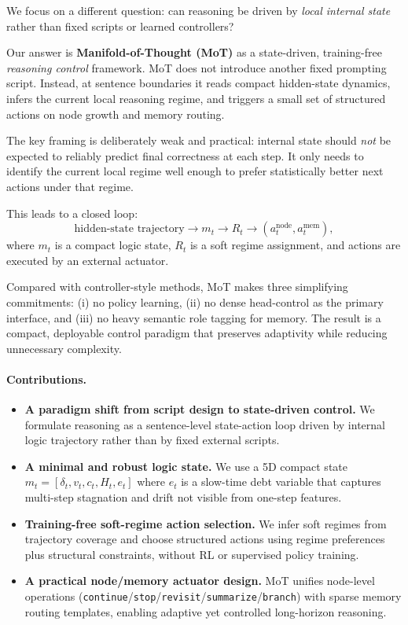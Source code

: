 \documentclass{article}
\begin{document}
We focus on a different question: can reasoning be driven by \emph{local internal state} rather than fixed scripts or learned controllers?

Our answer is \textbf{Manifold-of-Thought (MoT)} as a state-driven, training-free \emph{reasoning control} framework. MoT does not introduce another fixed prompting script. Instead, at sentence boundaries it reads compact hidden-state dynamics, infers the current local reasoning regime, and triggers a small set of structured actions on node growth and memory routing.

The key framing is deliberately weak and practical: internal state should \emph{not} be expected to reliably predict final correctness at each step. It only needs to identify the current local regime well enough to prefer statistically better next actions under that regime.

This leads to a closed loop:
\[
\text{hidden-state trajectory}
\rightarrow
m_t
\rightarrow
R_t
\rightarrow
(a_t^{\text{node}}, a_t^{\text{mem}}),
\]
where $m_t$ is a compact logic state, $R_t$ is a soft regime assignment, and actions are executed by an external actuator.

Compared with controller-style methods, MoT makes three simplifying commitments: (i) no policy learning, (ii) no dense head-control as the primary interface, and (iii) no heavy semantic role tagging for memory. The result is a compact, deployable control paradigm that preserves adaptivity while reducing unnecessary complexity.

\paragraph{Contributions.}
\begin{itemize}[leftmargin=1.3em, itemsep=0.2em]
    \item \textbf{A paradigm shift from script design to state-driven control.} We formulate reasoning as a sentence-level state-action loop driven by internal logic trajectory rather than by fixed external scripts.
    \item \textbf{A minimal and robust logic state.} We use a 5D compact state $m_t=[\delta_t,v_t,c_t,H_t,e_t]$ where $e_t$ is a slow-time debt variable that captures multi-step stagnation and drift not visible from one-step features.
    \item \textbf{Training-free soft-regime action selection.} We infer soft regimes from trajectory coverage and choose structured actions using regime preferences plus structural constraints, without RL or supervised policy training.
    \item \textbf{A practical node/memory actuator design.} MoT unifies node-level operations (\texttt{continue}/\texttt{stop}/\texttt{revisit}/\texttt{summarize}/\texttt{branch}) with sparse memory routing templates, enabling adaptive yet controlled long-horizon reasoning.
\end{itemize}
\end{document}
